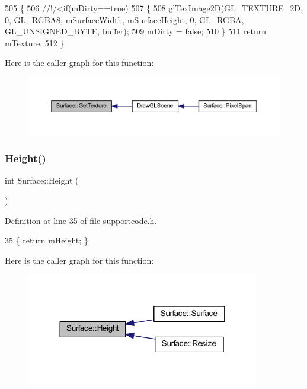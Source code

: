 \begin{DoxyCode}
505 \{\textcolor{comment}{}
506 \textcolor{comment}{    //!/<if(mDirty==true)}
507 \textcolor{comment}{}    \{
508         glTexImage2D(GL\_TEXTURE\_2D, 0, GL\_RGBA8, mSurfaceWidth, mSurfaceHeight, 0, GL\_RGBA, 
      GL\_UNSIGNED\_BYTE, buffer);
509         mDirty = \textcolor{keyword}{false};
510     \}
511     \textcolor{keywordflow}{return} mTexture; 
512 \}
\end{DoxyCode}
Here is the caller graph for this function\+:\nopagebreak
\begin{figure}[H]
\begin{center}
\leavevmode
\includegraphics[width=350pt]{class_surface_a2cd8789d26457187b8af4be8c178e9d4_icgraph}
\end{center}
\end{figure}
\mbox{\label{class_surface_ab901f48d51b3fd427415b580dc15518c}} 
\subsubsection{\texorpdfstring{Height()}{Height()}}
{\footnotesize\ttfamily int Surface\+::\+Height (\begin{DoxyParamCaption}{ }\end{DoxyParamCaption})\hspace{0.3cm}{\ttfamily [inline]}}



Definition at line 35 of file supportcode.\+h.


\begin{DoxyCode}
35 \{ \textcolor{keywordflow}{return} mHeight; \}
\end{DoxyCode}
Here is the caller graph for this function\+:\nopagebreak
\begin{figure}[H]
\begin{center}
\leavevmode
\includegraphics[width=288pt]{class_surface_ab901f48d51b3fd427415b580dc15518c_icgraph}
\end{center}
\end{figure}
\mbox{\label{class_surface_abe0d542404575c60911d6ad4219560f9}} 
